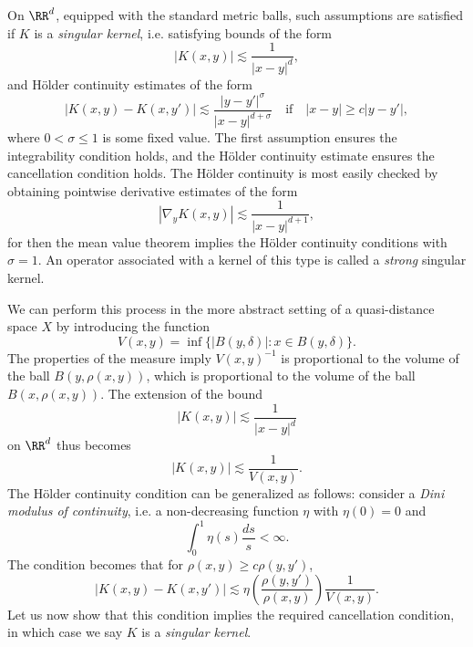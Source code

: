 On $\RR^d$, equipped with the standard metric balls, such assumptions are satisfied if $K$ is a \emph{singular kernel}, i.e. satisfying bounds of the form
%
\[ |K(x,y)| \lesssim \frac{1}{|x - y|^{d}}, \]
%
and H\"{o}lder continuity estimates of the form
%
\[ |K(x,y) - K(x,y')| \lesssim \frac{|y - y'|^\sigma}{|x - y|^{d + \sigma}} \quad\text{if}\quad |x - y| \geq c |y - y'|, \]
%
%
%
where $0 < \sigma \leq 1$ is some fixed value. The first assumption ensures the integrability condition holds, and the H\"{o}lder continuity estimate ensures the cancellation condition holds. The H\"{o}lder continuity is most easily checked by obtaining pointwise derivative estimates of the form
%
\[ |\nabla_y K(x,y)| \lesssim \frac{1}{|x - y|^{d+1}}, \]
%
for then the mean value theorem implies the H\"{o}lder continuity conditions with $\sigma = 1$. An operator associated with a kernel of this type is called a \emph{strong} singular kernel.

We can perform this process in the more abstract setting of a quasi-distance space $X$ by introducing the function
%
\[ V(x,y) = \inf \{ |B(y,\delta)| : x \in B(y,\delta) \}. \]
%
The properties of the measure imply $V(x,y)^{-1}$ is proportional to the volume of the ball $B(y,\rho(x,y))$, which is proportional to the volume of the ball $B(x,\rho(x,y))$. The extension of the bound
%
\[ |K(x,y)| \lesssim \frac{1}{|x - y|^d} \]
%
on $\RR^d$ thus becomes
%
\[ |K(x,y)| \lesssim \frac{1}{V(x,y)}. \]
%
The H\"{o}lder continuity condition can be generalized as follows: consider a \emph{Dini modulus of continuity}, i.e. a non-decreasing function $\eta$ with $\eta(0) = 0$ and
%
\[ \int_0^1 \eta(s) \frac{ds}{s} < \infty. \]
%
The condition becomes that for $\rho(x,y) \geq c \rho(y,y')$,
%
\[ |K(x,y) - K(x,y')| \lesssim \eta \left( \frac{\rho(y,y')}{\rho(x,y)} \right) \frac{1}{V(x,y)}. \]
%
Let us now show that this condition implies the required cancellation condition, in which case we say $K$ is a \emph{singular kernel}.

